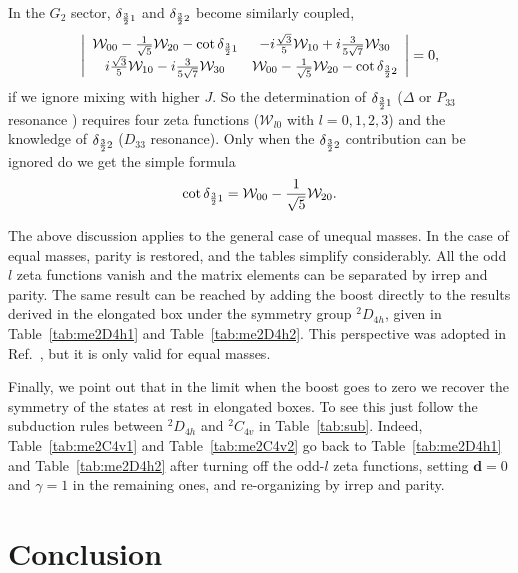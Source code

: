 \documentclass[aps,prd,reprint,showpacs,floatfix,longbibliography,,superscriptaddress]{revtex4-1}
\def\mw{\mathcal{W}}
\def\beq{\begin{equation}}
\def\eeq{\end{equation}}
\begin{document}
\begin{widetext}
In the $G_2$ sector,  $\delta_{{3\over 2}1}$ and $\delta_{{3\over 2}2}$ become similarly coupled,
\beq
\left |
\begin{array}{cc}       
\mw_{00}-\frac{1}{\sqrt{5}}  \mw_{20}   - \cot\delta_{{3\over 2}1} &  - i \frac{\sqrt{3}}{5}  \mw_{10}+ i \frac{3}{5 \sqrt{7}}     \mw_{30}      \\
i \frac{\sqrt{3}}{5}  \mw_{10}- i \frac{3}{5 \sqrt{7}}     \mw_{30}        &\mw_{00}-\frac{1}{\sqrt{5}}  \mw_{20}   - \cot\delta_{{3\over 2}2}   \\
\end{array}             
\right |                
=0,                     
\label{eq:detG2boost}
\eeq
if we ignore mixing with higher $J$. So the determination of $\delta_{{3\over 2}1}$ ($\Delta$ or $P_{33}$ resonance ) requires  four  zeta functions ($\mw_{l0}$ with $l=0,1,2,3$) and the knowledge of $\delta_{{3\over 2}2}$
($D_{33}$ resonance). Only when the $\delta_{{3\over 2}2}$ contribution can be ignored do we get the simple formula
\beq
 \cot\delta_{{3\over 2}1}  = \mw_{00}-\frac{1}{\sqrt{5}}  \mw_{20}. 
\eeq




The above discussion applies to the general case of unequal masses.
In the case of equal masses, parity is restored, and the tables simplify considerably.
All the odd $l$ zeta functions vanish and the matrix elements can be separated by irrep and parity.
The same result can be reached by adding the boost directly to the results derived in the elongated box 
under the symmetry group $^2D_{4h}$, given in Table~\ref{tab:me2D4h1} and Table~\ref{tab:me2D4h2}.
This perspective was adopted in Ref.~\cite{Guo:2016zos}, but it is only valid for equal masses.

Finally, we point out that in the limit when the boost goes to zero we recover the 
symmetry of the states at rest in elongated boxes. To see this just follow the subduction 
rules between $^2D_{4h}$ and $^2C_{4v}$  in Table~\ref{tab:sub}.
Indeed, Table~\ref{tab:me2C4v1} and Table~\ref{tab:me2C4v2} go back to Table~\ref{tab:me2D4h1} and Table~\ref{tab:me2D4h2} 
after turning off the odd-$l$ zeta functions, setting $\bm d=0$ and $\gamma=1$ in the remaining ones,  and re-organizing by irrep and parity.

\section{Conclusion}



\end{widetext}
\end{document}
